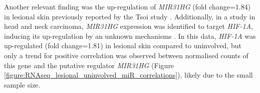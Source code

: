 Another relevant finding was the up-regulation of \textit{MIR31HG} (fold change=1.84) in lesional skin previously reported by the Tsoi study \parencite{Tsoi2015}. Additionally, in a study in head and neck carcinoma, \textit{MIR31HG} expression was identified to target \textit{HIF-1A}, inducing its up-regulation by an unknown mechanisms \parencite{Wang2018}. In this data, \textit{HIF-1A} was up-regulated (fold change=1.81) in lesional skin compared to uninvolved, but only a trend for positive correlation was observed between normalised counts of this gene and the putative regulator \textit{MIR31HG} (Figure \ref{figure:RNAseq_lesional_uninvolved_miR_correlations}), likely due to the small sample size.





